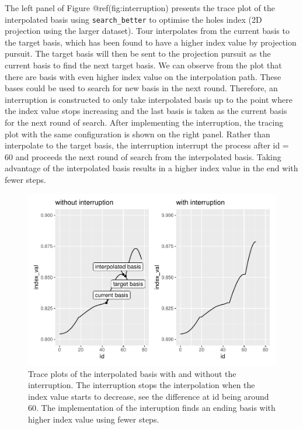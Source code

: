 \documentclass[12pt]{article}
\begin{document}
The left panel of Figure @ref(fig:interruption) presents the trace plot
of the interpolated basis using \texttt{search\_better} to optimise the
holes index (2D projection using the larger dataset). Tour interpolates
from the current basis to the target basis, which has been found to have
a higher index value by projection pursuit. The target basis will then
be sent to the projection pursuit as the current basis to find the next
target basis. We can observe from the plot that there are basis with
even higher index value on the interpolation path. These bases could be
used to search for new basis in the next round. Therefore, an
interruption is constructed to only take interpolated basis up to the
point where the index value stops increasing and the last basis is taken
as the current basis for the next round of search. After implementing
the interruption, the tracing plot with the same configuration is shown
on the right panel. Rather than interpolate to the target basis, the
interruption interrupt the process after id = 60 and proceeds the next
round of search from the interpolated basis. Taking advantage of the
interpolated basis results in a higher index value in the end with fewer
steps.

\begin{figure}
\centering
\includegraphics{paper_files/figure-latex/interruption-1.pdf}
\caption{\label{interruption} Trace plots of the interpolated basis with
and without the interruption. The interruption stops the interpolation
when the index value starts to decrease, see the difference at id being
around 60. The implementation of the interuption finds an ending basis
with higher index value using fewer steps.}
\end{figure}
\end{document}
